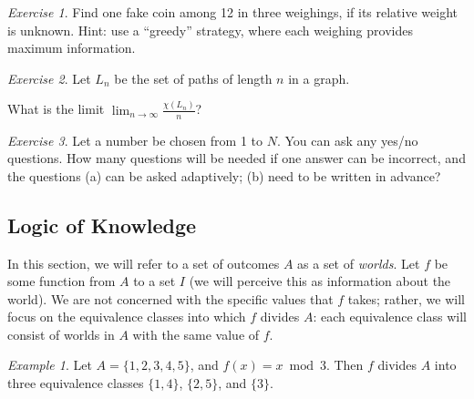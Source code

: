 \documentclass[12pt,sans]{article}
\theoremstyle{definition}
\theoremstyle{plain}
\theoremstyle{remark}
\newtheorem{example}{Example}[section]
\newtheorem{exercise}{Exercise}[section]
\begin{document}
\begin{exercise}
    Find one fake coin among 12 in three weighings, if its relative weight is unknown. Hint: use a ``greedy'' strategy, where each weighing provides maximum information.
\end{exercise}

\begin{exercise}
    Let \(L_n\) be the set of paths of length \(n\) in a graph.
    \begin{center}
    \end{center}
    What is the limit \(\lim_{n\to\infty} \frac{\chi(L_n)}{n}\)?
\end{exercise}

\begin{exercise}
    Let a number be chosen from 1 to \(N\). You can ask any yes/no questions. How many questions will be needed if one answer can be incorrect, and the questions (a) can be asked adaptively; (b) need to be written in advance?
\end{exercise}

\subsection{Logic of Knowledge}
In this section, we will refer to a set of outcomes \(A\) as a set of \emph{worlds}.
Let \(f\) be some function from \(A\) to a set \(I\) (we will perceive this as information about the world).
We are not concerned with the specific values that \(f\) takes; rather, we will focus on the equivalence classes into which \(f\) divides \(A\):
each equivalence class will consist of worlds in \(A\) with the same value of \(f\).

\begin{example}
    Let \(A = \{1,2,3,4,5\}\), and \(f(x) = x \bmod 3\). Then \(f\) divides \(A\) into three equivalence classes
    \(\{1,4\}\), \(\{2,5\}\), and \(\{3\}\).
\end{example}
\end{document}
